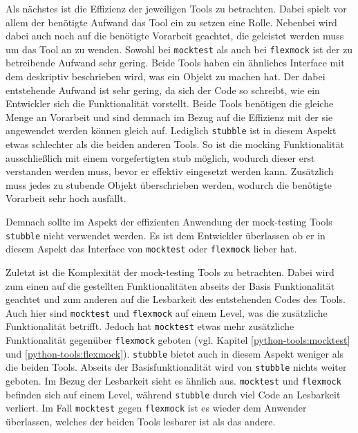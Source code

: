 Als nächstes ist die Effizienz der jeweiligen Tools zu betrachten. Dabei spielt
vor allem der benötigte Aufwand das Tool ein zu setzen eine Rolle. Nebenbei
wird dabei auch noch auf die benötigte Vorarbeit geachtet, die geleistet werden
muss um das Tool an zu wenden. Sowohl bei \lstinline{mocktest} als auch bei
\lstinline{flexmock} ist der zu betreibende Aufwand sehr gering. Beide Tools
haben ein ähnliches Interface mit dem deskriptiv beschrieben wird, was ein
Objekt zu machen hat. Der dabei entstehende Aufwand ist sehr gering, da sich
der Code so schreibt, wie ein Entwickler sich die Funktionalität vorstellt.
Beide Tools benötigen die gleiche Menge an Vorarbeit und sind demnach im Bezug
auf die Effizienz mit der sie angewendet werden können gleich auf. Lediglich
\lstinline{stubble} ist in diesem Aspekt etwas schlechter als die beiden
anderen Tools. So ist die \gls{mock}ing Funktionalität ausschließlich mit einem
vorgefertigten \Gls{stub} möglich, wodurch dieser erst verstanden werden muss,
bevor er effektiv eingesetzt werden kann. Zusätzlich muss jedes zu
\gls{stub}ende Objekt überschrieben werden, wodurch die benötigte Vorarbeit 
sehr hoch ausfällt.

Demnach sollte im Aspekt der effizienten Anwendung der \gls{mock}-testing Tools 
\lstinline{stubble} nicht verwendet werden. Es ist dem Entwickler überlassen ob 
er in diesem Aspekt das Interface von \lstinline{mocktest} oder 
\lstinline{flexmock} lieber hat.
\newline

Zuletzt ist die Komplexität der \gls{mock}-testing Tools zu betrachten. Dabei
wird zum einen auf die gestellten Funktionalitäten abseits der Basis
Funktionalität geachtet und zum anderen auf die Lesbarkeit des entstehenden
Codes des Tools. Auch hier sind \lstinline{mocktest} und \lstinline{flexmock}
auf einem Level, was die zusätzliche Funktionalität betrifft. Jedoch hat
\lstinline{mocktest} etwas mehr zusätzliche Funktionalität gegenüber
\lstinline{flexmock} geboten (vgl. Kapitel \ref{python-tools:mocktest} und
\ref{python-tools:flexmock}). \lstinline{stubble} bietet auch in diesem Aspekt
weniger als die beiden Tools. Abseits der Basisfunktionalität wird von
\lstinline{stubble} nichts weiter geboten. Im Bezug der Lesbarkeit sieht es
ähnlich aus. \lstinline{mocktest} und \lstinline{flexmock} befinden sich auf
einem Level, während \lstinline{stubble} durch viel Code an Lesbarkeit
verliert. Im Fall \lstinline{mocktest} gegen \lstinline{flexmock} ist es wieder
dem Anwender überlassen, welches der beiden Tools lesbarer ist als das andere.

